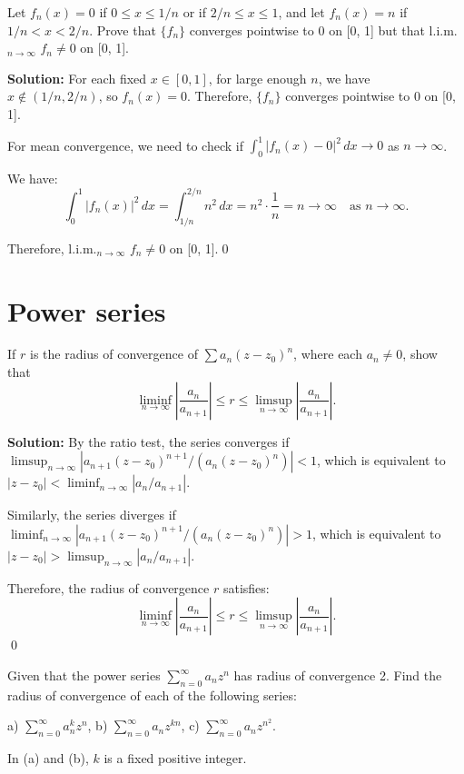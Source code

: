 \begin{problembox}
Let \( f_n(x) = 0 \) if \( 0 \leq x \leq 1/n \) or if \( 2/n \leq x \leq 1 \), and let \( f_n(x) = n \) if \( 1/n < x < 2/n \). Prove that \( \{f_n\} \) converges pointwise to 0 on [0, 1] but that l.i.m.\(_{n\to\infty}\) \( f_n \neq 0 \) on [0, 1].
\end{problembox}

\noindent\textbf{Solution:} For each fixed \( x \in [0, 1] \), for large enough \( n \), we have \( x \notin (1/n, 2/n) \), so \( f_n(x) = 0 \). Therefore, \( \{f_n\} \) converges pointwise to 0 on [0, 1].

For mean convergence, we need to check if \( \int_0^1 |f_n(x) - 0|^2 \, dx \to 0 \) as \( n \to \infty \).

We have:
\[\int_0^1 |f_n(x)|^2 \, dx = \int_{1/n}^{2/n} n^2 \, dx = n^2 \cdot \frac{1}{n} = n \to \infty \quad \text{as } n \to \infty.\]

Therefore, l.i.m.\(_{n\to\infty}\) \( f_n \neq 0 \) on [0, 1].\qed
\section{Power series}



\begin{problembox}
If \( r \) is the radius of convergence of \( \sum a_n(z - z_0)^n \), where each \( a_n \neq 0 \), show that
\[ \liminf_{n\to\infty} \left| \frac{a_n}{a_{n+1}} \right| \leq r \leq \limsup_{n\to\infty} \left| \frac{a_n}{a_{n+1}} \right|.\]
\end{problembox}

\noindent\textbf{Solution:} By the ratio test, the series converges if \( \limsup_{n\to\infty} |a_{n+1}(z - z_0)^{n+1} / (a_n(z - z_0)^n)| < 1 \), which is equivalent to \( |z - z_0| < \liminf_{n\to\infty} |a_n/a_{n+1}| \).

Similarly, the series diverges if \( \liminf_{n\to\infty} |a_{n+1}(z - z_0)^{n+1} / (a_n(z - z_0)^n)| > 1 \), which is equivalent to \( |z - z_0| > \limsup_{n\to\infty} |a_n/a_{n+1}| \).

Therefore, the radius of convergence \( r \) satisfies:
\[\liminf_{n\to\infty} \left| \frac{a_n}{a_{n+1}} \right| \leq r \leq \limsup_{n\to\infty} \left| \frac{a_n}{a_{n+1}} \right|.\]\qed


\begin{problembox}
Given that the power series \( \sum_{n=0}^{\infty} a_nz^n \) has radius of convergence 2. Find the radius of convergence of each of the following series:

a) \( \sum_{n=0}^{\infty} a_n^k z^n \),    b) \( \sum_{n=0}^{\infty} a_nz^{kn} \),    c) \( \sum_{n=0}^{\infty} a_nz^{n^2} \).

In (a) and (b), \( k \) is a fixed positive integer.
\end{problembox}

